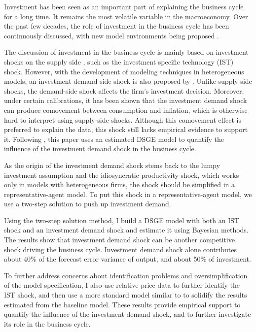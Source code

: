 Investment has been seen as an important part of explaining the business cycle for a long time. It remains the most volatile variable in the macroeconomy. Over the past few decades, the role of investment in the business cycle has been continuously discussed, with new model environments being proposed \citep{greenwoodInvestmentCapacityUtilization1988,greenwoodLongRunImplicationsInvestmentSpecific1997a,fisherDynamicEffectsNeutral2006,justinianoInvestmentShocksBusiness2010,winberryLumpyInvestmentBusiness2021}.

The discussion of investment in the business cycle is mainly based on investment shocks on the supply side \cite{fisherDynamicEffectsNeutral2006, justinianoInvestmentShocksBusiness2010}, such as the investment specific technology (IST) shock. However, with the development of modeling techniques in heterogeneous models, an investment demand-side shock is also proposed by \cite{nireiOriginsPropagationAnimal}. Unlike supply-side shocks, the demand-side shock affects the firm's investment decision. Moreover, under certain calibrations, it has been shown that the investment demand shock can produce comovement between consumption and inflation, which is otherwise hard to interpret using supply-side shocks. Although this comovement effect is preferred to explain the data, this shock still lacks empirical evidence to support it. Following \cite{justinianoInvestmentShocksBusiness2010}, this paper uses an estimated DSGE model to quantify the influence of the investment demand shock in the business cycle.

As the origin of the investment demand shock stems back to the lumpy investment assumption and the idiosyncratic productivity shock, which works only in models with heterogeneous firms, the shock should be simplified in a representative-agent model. To put this shock in a representative-agent model, we use a two-step solution to push up investment demand.

Using the two-step solution method, I build a DSGE model with both an IST shock and an investment demand shock and estimate it using Bayesian methods. The results show that investment demand shock can be another competitive shock driving the business cycle. Investment demand shock alone contributes about 40\% of the forecast error variance of output, and about 50\% of investment.

To further address concerns about identification problems and oversimplification of the model specification, I also use relative price data to further identify the IST shock, and then use a more standard model similar to \cite{smetsShocksFrictionsUS2007} to solidify the results estimated from the baseline model. These results provide empirical support to quantify the influence of the investment demand shock, and to further investigate its role in the business cycle.
